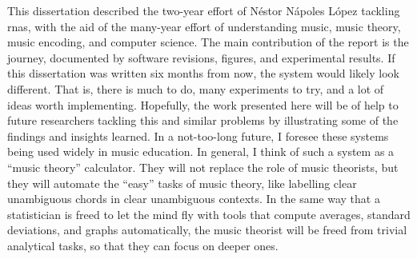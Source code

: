 
This dissertation described the two-year effort of N\'estor
N\'apoles L\'opez tackling \glspl{rna}, with the aid of the
many-year effort of understanding music, music theory, music
encoding, and computer science. The main contribution of the
report is the journey, documented by software revisions,
figures, and experimental results. If this dissertation was
written six months from now, the system would likely look
different. That is, there is much to do, many experiments to
try, and a lot of ideas worth implementing. Hopefully, the
work presented here will be of help to future researchers
tackling this and similar problems by illustrating some of
the findings and insights learned. In a not-too-long future,
I foresee these systems being used widely in music
education. In general, I think of such a system as a ``music
theory'' calculator. They will not replace the role of music
theorists, but they will automate the ``easy'' tasks of
music theory, like labelling clear unambiguous chords in
clear unambiguous contexts. In the same way that a
statistician is freed to let the mind fly with tools that
compute averages, standard deviations, and graphs
automatically, the music theorist will be freed from trivial
analytical tasks, so that they can focus on deeper ones. 

